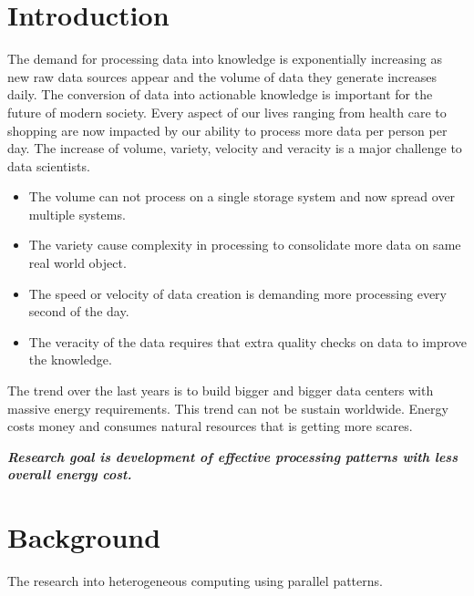 \documentclass{acm_proc_article-sp}
\begin{document}
\section{Introduction}
The demand for processing data into knowledge is exponentially increasing as new raw data sources appear and the volume of data they generate increases daily. The conversion of data into actionable knowledge is important for the future of modern society. 
Every aspect of our lives ranging from health care to shopping are now impacted by our ability to process more data per person per day. 
The increase of volume, variety, velocity and veracity is a major challenge to data scientists. \cite{khokhar1993heterogeneous}
\begin{itemize}
  \item The volume can not process on a single storage system and now spread over multiple systems. 
  \item The variety cause complexity in processing to consolidate more data on same real world object. 
  \item The speed or velocity of data creation is demanding more processing every second of the day. 
  \item The veracity of the data requires that extra quality checks on data to improve the knowledge.
\end{itemize}
The trend over the last years is to build bigger and bigger data centers with massive energy requirements. This trend can not be sustain worldwide. Energy costs money and consumes natural resources that is getting more scares.

\textbf{\textit{Research goal is development of effective processing patterns with less overall energy cost.}}
\section{Background}
The research into heterogeneous computing using parallel patterns.
\end{document}
